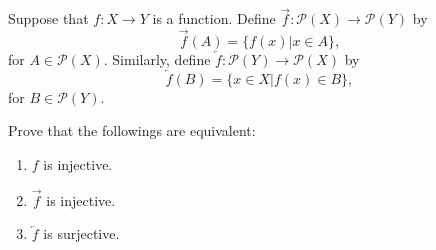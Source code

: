 \documentclass[../main.tex]{subfiles}
\begin{document}
\begin{exercise}
    Suppose that $f: X \rightarrow Y$ is a function.
    Define $\overrightarrow f: \mathcal{P}(X) \rightarrow \mathcal{P}(Y)$ by
    \[
        \overrightarrow f(A) = \{f(x) | x \in A\},
    \]
    for $A \in \mathcal{P}(X)$.
    Similarly, define $\overleftarrow f: \mathcal{P}(Y) \rightarrow \mathcal{P}(X)$ by
    \[
        \overleftarrow f(B) = \{x \in X | f(x) \in B\},
    \]
    for $B \in \mathcal{P} (Y)$.

    Prove that the followings are equivalent:
    \begin{enumerate}
        \item $f$ is injective.
        \item $\overrightarrow f$ is injective.
        \item $\overleftarrow f$ is surjective.
    \end{enumerate}
\end{exercise}
\end{document}

